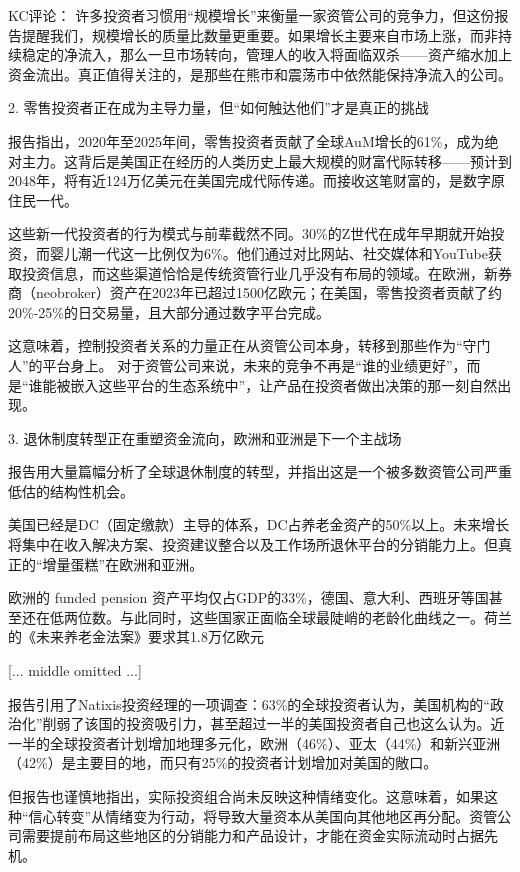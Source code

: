 \documentclass[11pt]{ctexart}
\begin{document}
KC评论： 许多投资者习惯用“规模增长”来衡量一家资管公司的竞争力，但这份报告提醒我们，规模增长的质量比数量更重要。如果增长主要来自市场上涨，而非持续稳定的净流入，那么一旦市场转向，管理人的收入将面临双杀——资产缩水加上资金流出。真正值得关注的，是那些在熊市和震荡市中依然能保持净流入的公司。

2. 零售投资者正在成为主导力量，但“如何触达他们”才是真正的挑战

报告指出，2020年至2025年间，零售投资者贡献了全球AuM增长的61\%，成为绝对主力。这背后是美国正在经历的人类历史上最大规模的财富代际转移——预计到2048年，将有近124万亿美元在美国完成代际传递。而接收这笔财富的，是数字原住民一代。

这些新一代投资者的行为模式与前辈截然不同。30\%的Z世代在成年早期就开始投资，而婴儿潮一代这一比例仅为6\%。他们通过对比网站、社交媒体和YouTube获取投资信息，而这些渠道恰恰是传统资管行业几乎没有布局的领域。在欧洲，新券商（neobroker）资产在2023年已超过1500亿欧元；在美国，零售投资者贡献了约20\%-25\%的日交易量，且大部分通过数字平台完成。

这意味着，控制投资者关系的力量正在从资管公司本身，转移到那些作为“守门人”的平台身上。 对于资管公司来说，未来的竞争不再是“谁的业绩更好”，而是“谁能被嵌入这些平台的生态系统中”，让产品在投资者做出决策的那一刻自然出现。

3. 退休制度转型正在重塑资金流向，欧洲和亚洲是下一个主战场

报告用大量篇幅分析了全球退休制度的转型，并指出这是一个被多数资管公司严重低估的结构性机会。

美国已经是DC（固定缴款）主导的体系，DC占养老金资产的50\%以上。未来增长将集中在收入解决方案、投资建议整合以及工作场所退休平台的分销能力上。但真正的“增量蛋糕”在欧洲和亚洲。

欧洲的 funded pension 资产平均仅占GDP的33\%，德国、意大利、西班牙等国甚至还在低两位数。与此同时，这些国家正面临全球最陡峭的老龄化曲线之一。荷兰的《未来养老金法案》要求其1.8万亿欧元

[... middle omitted ...]


报告引用了Natixis投资经理的一项调查：63\%的全球投资者认为，美国机构的“政治化”削弱了该国的投资吸引力，甚至超过一半的美国投资者自己也这么认为。近一半的全球投资者计划增加地理多元化，欧洲（46\%）、亚太（44\%）和新兴亚洲（42\%）是主要目的地，而只有25\%的投资者计划增加对美国的敞口。

但报告也谨慎地指出，实际投资组合尚未反映这种情绪变化。这意味着，如果这种“信心转变”从情绪变为行动，将导致大量资本从美国向其他地区再分配。资管公司需要提前布局这些地区的分销能力和产品设计，才能在资金实际流动时占据先机。
\end{document}

